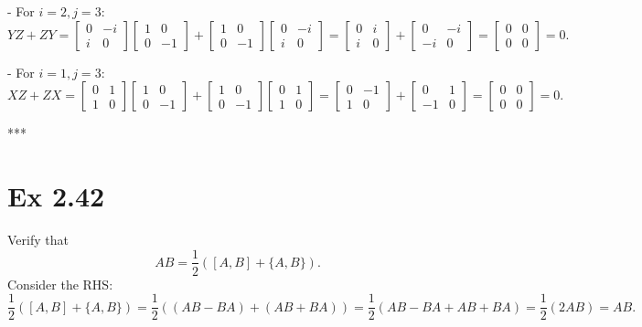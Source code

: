 \documentclass{article}
\newcommand{\0}{{$|0\rangle$}}
\newcommand{\1}{{$|1\rangle$}}
\begin{document}
- For $i=2, j=3$:  
$$
YZ + ZY = \begin{bmatrix} 0 & -i \\ i & 0 \end{bmatrix} \begin{bmatrix} 1 & 0 \\ 0 & -1 \end{bmatrix} + \begin{bmatrix} 1 & 0 \\ 0 & -1 \end{bmatrix} \begin{bmatrix} 0 & -i \\ i & 0 \end{bmatrix} = \begin{bmatrix} 0 & i \\ i & 0 \end{bmatrix} + \begin{bmatrix} 0 & -i \\ -i & 0 \end{bmatrix} = \begin{bmatrix} 0 & 0 \\ 0 & 0 \end{bmatrix} = 0.
$$

- For $i=1, j=3$:  
$$
XZ + ZX = \begin{bmatrix} 0 & 1 \\ 1 & 0 \end{bmatrix} \begin{bmatrix} 1 & 0 \\ 0 & -1 \end{bmatrix} + \begin{bmatrix} 1 & 0 \\ 0 & -1 \end{bmatrix} \begin{bmatrix} 0 & 1 \\ 1 & 0 \end{bmatrix} = \begin{bmatrix} 0 & -1 \\ 1 & 0 \end{bmatrix} + \begin{bmatrix} 0 & 1 \\ -1 & 0 \end{bmatrix} = \begin{bmatrix} 0 & 0 \\ 0 & 0 \end{bmatrix} = 0.
$$

***

\newpage
\section*{Ex 2.42 } 
Verify that  
$$
AB = \frac{1}{2}([A,B] + \{A,B\}).
$$  
Consider the RHS:  
$$
\frac{1}{2}([A,B] + \{A,B\}) = \frac{1}{2}((AB - BA) + (AB + BA)) = \frac{1}{2}(AB - BA + AB + BA) = \frac{1}{2}(2AB) = AB.
$$
\end{document}
